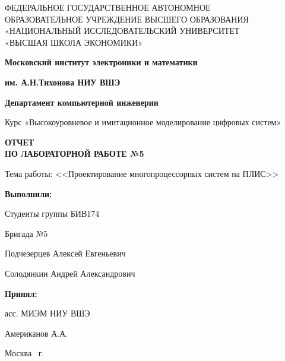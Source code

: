 \begin{titlepage}
    \begin{center}
        ФЕДЕРАЛЬНОЕ ГОСУДАРСТВЕННОЕ АВТОНОМНОЕ \\
        ОБРАЗОВАТЕЛЬНОЕ УЧРЕЖДЕНИЕ ВЫСШЕГО ОБРАЗОВАНИЯ\\
        «НАЦИОНАЛЬНЫЙ ИССЛЕДОВАТЕЛЬСКИЙ УНИВЕРСИТЕТ\\
        «ВЫСШАЯ ШКОЛА ЭКОНОМИКИ»
    \end{center}

    \begin{center}
        \textbf{Московский институт электроники и математики}

        \textbf{им. А.Н.Тихонова НИУ ВШЭ}

        \vspace{2ex}

        \textbf{Департамент компьютерной инженерии}
    \end{center}
    \vspace{1ex}

    \begin{center}
        Курс «Высокоуровневое и имитационное моделирование цифровых систем»
    \end{center}


    \begin{center}
        \textbf{ОТЧЕТ\\
        ПО ЛАБОРАТОРНОЙ РАБОТЕ №5
        }
    \end{center}

    \begin{center}
        Тема работы: <<Проектирование многопроцессорных систем на ПЛИС>>
    \end{center}

    \vspace{2ex}

    \begin{flushright}
        \textbf{Выполнили:}

        \vspace{2ex}

        Студенты группы БИВ174

        Бригада №5

        \vspace{2ex}

        Подчезерцев Алексей Евгеньевич

        Солодянкин Андрей Александрович
        \vspace{2ex}

        \textbf{Принял:}

        асс. МИЭМ НИУ ВШЭ

        Американов А.А.

    \end{flushright}

    \vfill
    \begin{center}
        Москва \the\year \, г.
    \end{center}

\end{titlepage}
\addtocounter{page}{1}